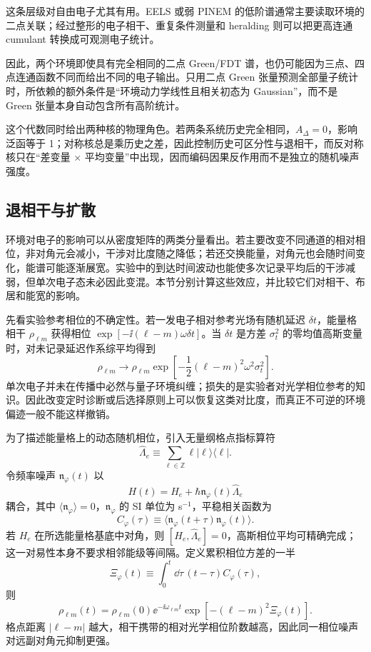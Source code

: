 这条层级对自由电子尤其有用。EELS 或弱 PINEM 的低阶谱通常主要读取环境的二点关联；经过整形的电子相干、重复条件测量和 heralding 则可以把更高连通 cumulant 转换成可观测电子统计。

因此，两个环境即使具有完全相同的二点 Green/FDT 谱，也仍可能因为三点、四点连通函数不同而给出不同的电子输出。只用二点 Green 张量预测全部量子统计时，所依赖的额外条件是“环境动力学线性且相关初态为 Gaussian”，而不是 Green 张量本身自动包含所有高阶统计。



这个代数同时给出两种核的物理角色。若两条系统历史完全相同，$A_\Delta=0$，影响泛函等于 1；对称核总是乘历史之差，因此控制历史可区分性与退相干，而反对称核只在“差变量 $\times$ 平均变量”中出现，因而编码因果反作用而不是独立的随机噪声强度。

\subsection{退相干与扩散}

环境对电子的影响可以从密度矩阵的两类分量看出。若主要改变不同通道的相对相位，非对角元会减小，干涉对比度随之降低；若还交换能量，对角元也会随时间变化，能谱可能逐渐展宽。实验中的到达时间波动也能使多次记录平均后的干涉减弱，但单次电子态未必因此变混。本节分别计算这些效应，并比较它们对相干、布居和能宽的影响。

先看实验参考相位的不确定性。若一发电子相对参考光场有随机延迟 $\delta t$，能量格相干 $\rho_{\ell m}$ 获得相位 $\exp[-\ii(\ell-m)\omega\delta t]$。当 $\delta t$ 是方差 $\sigma_t^2$ 的零均值高斯变量时，对未记录延迟作系综平均得到
\begin{equation}
\boxed{
\rho_{\ell m}\longrightarrow
\rho_{\ell m}
\exp\!\left[-\frac12(\ell-m)^2\omega^2\sigma_t^2\right].}
\label{eq:arrival_jitter_dephasing}
\end{equation}
单次电子并未在传播中必然与量子环境纠缠；损失的是实验者对光学相位参考的知识。因此改变定时诊断或后选择原则上可以恢复这类对比度，而真正不可逆的环境偏迹一般不能这样撤销。

为了描述能量格上的动态随机相位，引入无量纲格点指标算符
\[
\hat\Lambda_e\equiv\sum_{\ell\in\mathbb Z}\ell|\ell\rangle\langle\ell|.
\]
令频率噪声 $\mathfrak n_\varphi(t)$ 以
\[
H(t)=H_e+\hbar\mathfrak n_\varphi(t)\hat\Lambda_e
\]
耦合，其中 $\langle\mathfrak n_\varphi\rangle=0$，$\mathfrak n_\varphi$ 的 SI 单位为 s$^{-1}$，平稳相关函数为
\[
C_\varphi(\tau)
\equiv\langle\mathfrak n_\varphi(t+\tau)\mathfrak n_\varphi(t)\rangle.
\]
若 $H_e$ 在所选能量格基底中对角，则 $[H_e,\hat\Lambda_e]=0$，高斯相位平均可精确完成；这一对易性本身不要求相邻能级等间隔。定义累积相位方差的一半
\[
\Xi_\varphi(t)
\equiv\int_0^t\dd\tau\,(t-\tau)C_\varphi(\tau),
\]
则
\begin{equation}
\boxed{
\rho_{\ell m}(t)
=\rho_{\ell m}(0)\ee^{-\ii\omega_{\ell m}t}
\exp[-(\ell-m)^2\Xi_\varphi(t)].}
\label{eq:exact_gaussian_dephasing_electron}
\end{equation}
格点距离 $|\ell-m|$ 越大，相干携带的相对光学相位阶数越高，因此同一相位噪声对远副对角元抑制更强。

